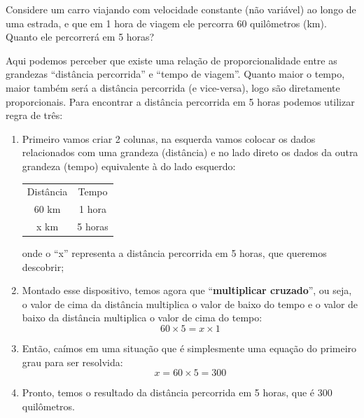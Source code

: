\begin{exemplo}
    Considere um carro viajando com velocidade constante (não variável) ao longo de uma estrada, e que em 1 hora de viagem ele percorra 60 quilômetros (km). Quanto ele percorrerá em 5 horas?

    Aqui podemos perceber que existe uma relação de proporcionalidade entre as grandezas ``distância percorrida'' e ``tempo de viagem''. Quanto maior o tempo, maior também será a distância percorrida (e vice-versa), logo são diretamente proporcionais. Para encontrar a distância percorrida em 5 horas podemos utilizar regra de três:

    \begin{enumerate}
        \item Primeiro vamos criar 2 colunas, na esquerda vamos colocar os dados relacionados com uma grandeza (distância) e no lado direto os dados da outra grandeza (tempo) equivalente à do lado esquerdo:
        \begin{table}[H]
            \centering
            \begin{tabular}{cc}
                Distância & Tempo \\
                60 km & 1 hora\\
                 x km & 5 horas
            \end{tabular}

        \end{table}
        onde o ``x'' representa a distância percorrida em 5 horas, que queremos descobrir;
        \item Montado esse dispositivo, temos agora que ``\textbf{multiplicar cruzado}'', ou seja, o valor de cima da distância multiplica o valor de baixo do tempo e o valor de baixo da distância multiplica o valor de cima do tempo:
        \begin{equation}
            60\times5=x\times1
        \end{equation}
        \item Então, caímos em uma situação que é simplesmente uma equação do primeiro grau para ser resolvida:
        \begin{equation}
            x=60\times5=300
        \end{equation}
        \item Pronto, temos o resultado da distância percorrida em 5 horas, que é 300 quilômetros.
    \end{enumerate}
\end{exemplo}

